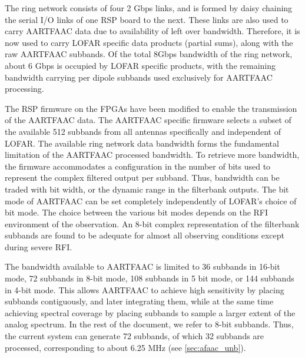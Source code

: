\documentclass{ws-jai}
\begin{document}
The ring network consists of four 2  Gbps links, and is formed by daisy chaining
the serial I/O links of one RSP board to the next.  These links are also used to
carry AARTFAAC data  due to availability of left over  bandwidth.  Therefore, it
is now used to carry LOFAR specific data products (partial sums), along with the
raw AARTFAAC subbands.  Of the total  8Gbps bandwidth of the ring network, about
6 Gbps  is occupied  by LOFAR  specific products,  with the  remaining bandwidth
carrying per dipole subbands used exclusively for AARTFAAC processing.


The RSP firmware on  the FPGAs have been modified to  enable the transmission of
the  AARTFAAC data.   The AARTFAAC  specific firmware  selects a  subset of  the
available 512 subbands from all  antennas specifically and independent of LOFAR.
The available  ring network data  bandwidth forms the fundamental  limitation of
the  AARTFAAC processed  bandwidth.  To  retrieve more  bandwidth, the  firmware
accommodates a configuration in the number of bits used to represent the complex
filtered output per  subband.  Thus, bandwidth can be traded  with bit width, or
the dynamic range  in the filterbank outputs.   The bit mode of  AARTFAAC can be
set completely independently of LOFAR's choice  of bit mode.  The choice between
the various  bit modes depends  on the RFI  environment of the  observation.  An
8-bit complex representation of the filterbank subbands are found to be adequate
for almost all observing conditions except during severe RFI.

The bandwidth available to AARTFAAC is limited to 36 subbands in 16-bit mode, 72
subbands in  8-bit mode, 108 subbands  in 5 bit  mode, or 144 subbands  in 4-bit
mode.   This allows  AARTFAAC to  achieve high  sensitivity by  placing subbands
contiguously,  and later  integrating them,  while  at the  same time  achieving
spectral coverage  by placing subbands to  sample a larger extent  of the analog
spectrum. In the  rest of the document,  we refer to 8-bit  subbands.  Thus, the
current system  can generate 72  subbands, of  which 32 subbands  are processed,
corresponding to about 6.25 MHz (see \ref{sec:afaac_unb}).\\
\end{document}
